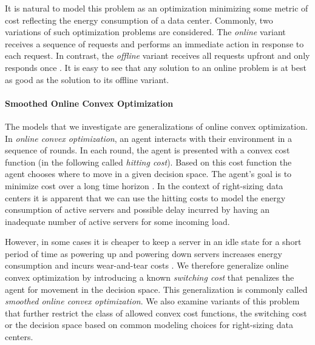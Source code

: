 It is natural to model this problem as an optimization minimizing some metric of cost reflecting the energy consumption of a data center. Commonly, two variations of such optimization problems are considered. The \textit{online} variant receives a sequence of requests and performs an immediate action in response to each request. In contrast, the \textit{offline} variant receives all requests upfront and only responds once \cite{Karp1992}. It is easy to see that any solution to an online problem is at best as good as the solution to its offline variant.

\paragraph{Smoothed Online Convex Optimization} The models that we investigate are generalizations of online convex optimization. In \textit{online convex optimization}, an agent interacts with their environment in a sequence of rounds. In each round, the agent is presented with a convex cost function (in the following called \textit{hitting cost}). Based on this cost function the agent chooses where to move in a given decision space. The agent's goal is to minimize cost over a long time horizon \cite{Hazan2019}. In the context of right-sizing data centers it is apparent that we can use the hitting costs to model the energy consumption of active servers and possible delay incurred by having an inadequate number of active servers for some incoming load.

However, in some cases it is cheaper to keep a server in an idle state for a short period of time as powering up and powering down servers increases energy consumption and incurs wear-and-tear costs \cite{Lin2011}. We therefore generalize online convex optimization by introducing a known \textit{switching cost} that penalizes the agent for movement in the decision space. This generalization is commonly called \textit{smoothed online convex optimization}. We also examine variants of this problem that further restrict the class of allowed convex cost functions, the switching cost or the decision space based on common modeling choices for right-sizing data centers.

